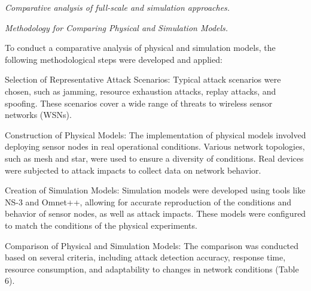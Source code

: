 \begin{multicols}{2}
\emph{Comparative analysis of full-scale and simulation approaches.}

\emph{Methodology for Comparing Physical and Simulation Models.}

To conduct a comparative analysis of physical and simulation models, the
following methodological steps were developed and applied:

Selection of Representative Attack Scenarios: Typical attack scenarios
were chosen, such as jamming, resource exhaustion attacks, replay
attacks, and spoofing. These scenarios cover a wide range of threats to
wireless sensor networks (WSNs).


Construction of Physical Models: The implementation of physical models
involved deploying sensor nodes in real operational conditions. Various
network topologies, such as mesh and star, were used to ensure a
diversity of conditions. Real devices were subjected to attack impacts
to collect data on network behavior.

Creation of Simulation Models: Simulation models were developed using
tools like NS-3 and Omnet++, allowing for accurate reproduction of the
conditions and behavior of sensor nodes, as well as attack impacts.
These models were configured to match the conditions of the physical
experiments.

Comparison of Physical and Simulation Models: The comparison was
conducted based on several criteria, including attack detection
accuracy, response time, resource consumption, and adaptability to
changes in network conditions (Table 6).
\end{multicols}

